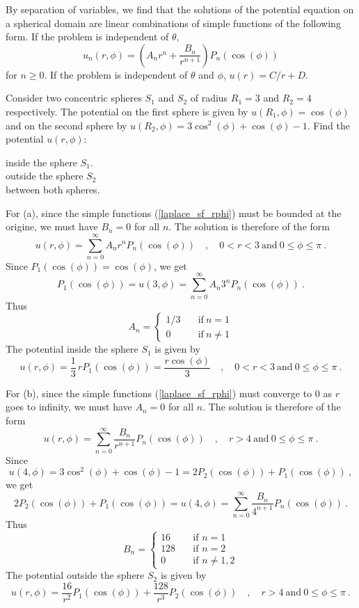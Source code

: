By separation of variables, we find that the solutions of the
potential equation on a spherical domain are linear combinations of
simple functions of the following form.  If the problem is independent
of $\theta$,
\begin{equation}\label{laplace_sf_rphi}
u_n(r,\phi) = \left(A_n r^n + \frac{B_n}{r^{n+1}} \right)
P_n(\cos(\phi))
\end{equation}
for $n \geq 0$.  If the problem is independent of $\theta$ and $\phi$,
$\displaystyle u(r) = C/r + D$.

\begin{egg}
Consider two concentric spheres $S_1$ and $S_2$ of radius $R_1=3$ and
$R_2=4$ respectively.  The potential on the first sphere is given by
$u(R_1,\phi) = \cos(\phi)$ and on the second sphere by
$u(R_2,\phi)= 3 \cos^2(\phi) + \cos(\phi) -1$.  Find the potential
$u(r,\phi)$:

 inside the sphere $S_1$.\\
 outside the sphere $S_2$\\
 between both spheres.

For (a), since the simple functions (\ref{laplace_sf_rphi}) must be
bounded at the origine, we must have $B_n=0$ for all $n$.  The
solution is therefore of the form
\[
u(r,\phi) = \sum_{n=0}^\infty A_n r^n P_n(\cos(\phi))
\quad , \quad 0 < r < 3 \ \text{and} \ 0 \leq \phi \leq \pi \ .
\]
Since $P_1(\cos(\phi)) = \cos(\phi)$, we get
\[
P_1(\cos(\phi)) = u(3,\phi) = \sum_{n=0}^\infty A_n 3^n P_n(\cos(\phi)) \ .
\]
Thus
\[
A_n = \begin{cases}
1/3 & \quad \text{if}\ n=1\\
0 & \quad \text{if} \ n\neq 1
\end{cases}
\]
The potential inside the sphere $S_1$ is given by
\[
u(r,\phi) = \frac{1}{3} \, r P_1(\cos(\phi)) = \frac{r\cos(\phi)}{3}
\quad , \quad 0 < r < 3 \ \text{and} \ 0 \leq \phi \leq \pi \ .
\]

For (b), since the simple functions (\ref{laplace_sf_rphi}) must converge to
$0$ as $r$ goes to infinity, we must have $A_n=0$ for all $n$.  The solution is
therefore of the form
\[
u(r,\phi) = \sum_{n=0}^\infty \frac{B_n}{r^{n+1}}
P_n(\cos(\phi))
\quad , \quad r > 4 \ \text{and} \ 0 \leq \phi \leq \pi \ .
\]
Since
\[
u(4,\phi) = 3 \cos^2(\phi) + \cos(\phi) -1 = 2 P_2(\cos(\phi)) +
P_1(\cos(\phi)) \ ,
\]
we get
\[
2 P_2(\cos(\phi)) + P_1(\cos(\phi)) = u(4,\phi)
= \sum_{n=0}^\infty \frac{B_n}{4^{n+1}} P_n(\cos(\phi)) \ .
\]
Thus
\[
B_n = \begin{cases}
16 & \quad \text{if $n=1$}\\
128 & \quad \text{if $n=2$} \\
0 &  \quad \text{if $n\neq 1,2$}
\end{cases}
\]
The potential outside the sphere $S_2$ is given by
\[
u(r,\phi) = \frac{16}{r^2} P_1(\cos(\phi)) + \frac{128}{r^3} P_2(\cos(\phi))
\quad , \quad r > 4 \ \text{and} \ 0 \leq \phi \leq \pi \ .
\]


\end{egg}
